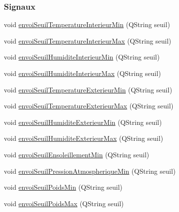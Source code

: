 \subsubsection*{Signaux}
\begin{DoxyCompactItemize}
\item 
void \hyperlink{class_reglages_alertes_ihm_a44b51f5bfba7a28ee82b5e08d042c153}{envoi\+Seuil\+Temperature\+Interieur\+Min} (Q\+String seuil)
\item 
void \hyperlink{class_reglages_alertes_ihm_aa2695b931056a81e6e33ae5e9867b872}{envoi\+Seuil\+Temperature\+Interieur\+Max} (Q\+String seuil)
\item 
void \hyperlink{class_reglages_alertes_ihm_a0d913b26dd22ce48aaebed82a0d3df62}{envoi\+Seuil\+Humidite\+Interieur\+Min} (Q\+String seuil)
\item 
void \hyperlink{class_reglages_alertes_ihm_ae5e409ea2353cc8e43f312e252b365f9}{envoi\+Seuil\+Humidite\+Interieur\+Max} (Q\+String seuil)
\item 
void \hyperlink{class_reglages_alertes_ihm_a5c4cadb3f7a76cecc0bafaa297b2898a}{envoi\+Seuil\+Temperature\+Exterieur\+Min} (Q\+String seuil)
\item 
void \hyperlink{class_reglages_alertes_ihm_a626e1067d882bb5c0b86c8e0fb063dcc}{envoi\+Seuil\+Temperature\+Exterieur\+Max} (Q\+String seuil)
\item 
void \hyperlink{class_reglages_alertes_ihm_a78cef50cbaaaa46c837230024129c092}{envoi\+Seuil\+Humidite\+Exterieur\+Min} (Q\+String seuil)
\item 
void \hyperlink{class_reglages_alertes_ihm_a1455ae71d0e6c33b7857a23d116f3248}{envoi\+Seuil\+Humidite\+Exterieur\+Max} (Q\+String seuil)
\item 
void \hyperlink{class_reglages_alertes_ihm_a1ff9b472f2eed0efece54da863497324}{envoi\+Seuil\+Ensoleillement\+Min} (Q\+String seuil)
\item 
void \hyperlink{class_reglages_alertes_ihm_a78ea60b683ff8bde49d8bd332eb71c57}{envoi\+Seuil\+Pression\+Atmospherique\+Min} (Q\+String seuil)
\item 
void \hyperlink{class_reglages_alertes_ihm_a6d4642c0f64bad9f070ce7988549f8df}{envoi\+Seuil\+Poids\+Min} (Q\+String seuil)
\item 
void \hyperlink{class_reglages_alertes_ihm_a60d8e26bf08448029f4592b10297bdd1}{envoi\+Seuil\+Poids\+Max} (Q\+String seuil)
\end{DoxyCompactItemize}
